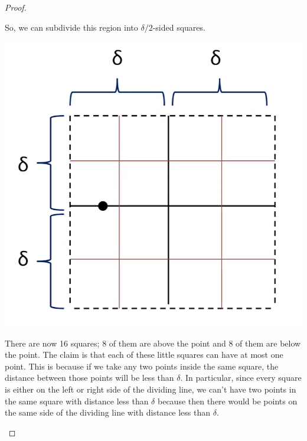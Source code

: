 \documentclass[letterpaper]{article}
\begin{document}
\begin{mdframed}[]
\begin{proof}
\begin{center}
        \end{center}
        So, we can subdivide this region into $\delta / 2$-sided squares. 
        \begin{center}
            \includegraphics[scale=0.37]{../assets/closest_proof_3.png}
        \end{center}
        There are now 16 squares; 8 of them are above the point and 8 of them are below the point. The claim is that each of these little squares can have at most one point. This is because if we take any two points inside the same square, the distance between those points will be less than $\delta$. In particular, since every square is either on the left or right side of the dividing line, we can't have two points in the same square with distance less than $\delta$ because then there would be points on the same side of the dividing line with distance less than $\delta$. 
        \begin{center}

\end{center}
\end{proof}
\end{mdframed}
\end{document}
